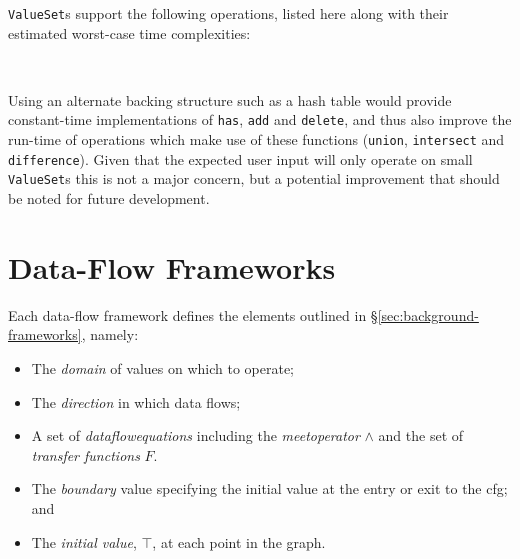 \documentclass[bsc,twoside,singlespacing,parskip,logo,notimes,normalheadings]{infthesis}
\begin{document}
    {\tt ValueSet}s support the following operations, listed here
    along with their estimated worst-case time complexities:

    \begin{table}[!ht]
      \centering
      \def\arraystretch{1.2}
      \\[2mm]
    \end{table}

    Using an alternate backing structure such as a hash table would
    provide constant-time implementations of {\tt has}, {\tt add} and
    {\tt delete}, and thus also improve the run-time of operations
    which make use of these functions ({\tt union}, {\tt intersect}
    and {\tt difference}). Given that the expected user input will
    only operate on small {\tt ValueSet}s this is not a major concern,
    but a potential improvement that should be noted for future
    development.
    
    \section{Data-Flow Frameworks}
    
    Each data-flow framework defines the elements outlined in
    \S\ref{sec:background-frameworks}, namely:

    \begin{itemize}
    \item The {\em \gls{domain}} of values on which to operate;
    \item The {\em \gls{direction}} in which data flows;
    \item A set of {\em \gls{dataflowequations}} including the {\em
        \gls{meetoperator}} $\land$ and the set of {\em
        \gls{transfer} functions} $F$.
    \item The {\em \gls{boundary}} value specifying the initial value
      at the entry or exit to the \gls{cfg}; and
    \item The {\em initial value}, $\top$, at each point in the graph.
    \end{itemize}
\end{document}
